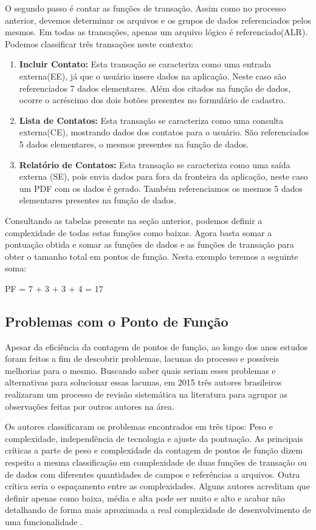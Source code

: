 O segundo passo é contar as funções de transação. Assim como no processo anterior, devemos determinar os arquivos e os grupos de dados referenciados pelos mesmos. Em todas as transações, apenas um arquivo lógico é referenciado(ALR). Podemos classificar três transações neste contexto:

\begin{enumerate}
	\item \textbf{Incluir Contato:} Esta transação se caracteriza como uma entrada externa(EE), já que o usuário insere dados na aplicação. Neste caso são referenciados 7 dados elementares. Além dos citados na função de dados, ocorre o acréscimo dos dois botões presentes no formulário de cadastro.

	\item \textbf{Lista de Contatos:} Esta transação se caracteriza como uma consulta externa(CE), mostrando dados dos contatos para o usuário. São referenciados 5 dados elementares, o mesmos presentes na função de dados.

	\item \textbf{Relatório de Contatos:} Esta transação se caracteriza como uma saída externa (SE), pois envia dados para fora da fronteira da aplicação, neste caso um PDF com os dados é gerado. Também referenciamos os mesmos 5 dados elementares presentes na função de dados.
\end{enumerate}

Consultando as tabelas presente na seção anterior, podemos definir a complexidade de todas estas funções como baixas. Agora basta somar a pontuação obtida e somar as funções de dados e as funções de transação para obter o tamanho total em pontos de função. Nesta exemplo teremos a seguinte soma:

\centerline{PF = 7 + 3 + 3 + 4 = 17}

\subsection{Problemas com o Ponto de Função}

Apesar da eficiência da contagem de pontos de função, ao longo dos anos estudos foram feitos a fim de descobrir problemas, lacunas do processo e possíveis melhorias para o mesmo. Buscando saber quais seriam esses problemas e alternativas para solucionar essas lacunas, em 2015 três autores brasileiros realizaram um processo de revisão sistemática na literatura para agrupar as observações feitas por outros autores na área.

Os autores classificaram os problemas encontrados em três tipos: Peso e complexidade, independência de tecnologia e ajuste da pontuação. As principais críticas a parte de peso e complexidade da contagem de pontos de função dizem respeito a mesma classificação em complexidade de duas funções de transação ou de dados com diferentes quantidades de campos e referências a arquivos. Outra crítica seria o espaçamento entre as complexidades. Alguns autores acreditam que definir apenas como baixa, média e alta pode ser muito e alto e acabar não detalhando de forma mais aproximada a real complexidade de desenvolvimento de uma funcionalidade \cite{Marcos:2015}.

